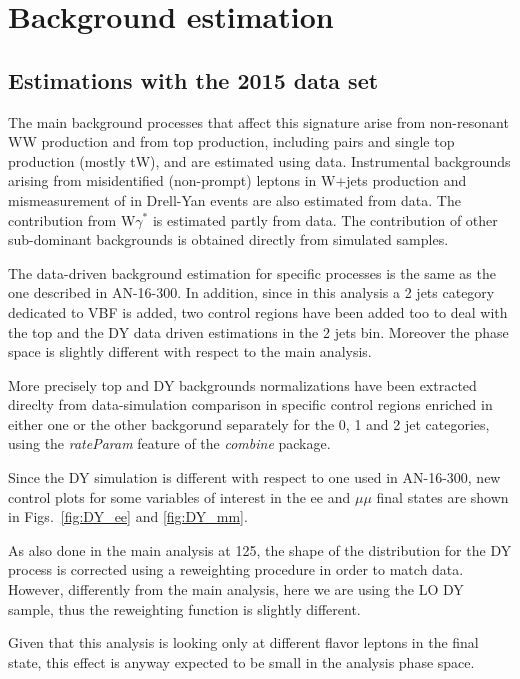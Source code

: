 \section{Background estimation}\label{sec:DataDriven}

\subsection{Estimations with the 2015 data set}

The main background processes that affect this signature arise from non-resonant WW production and from top production, including \ttbar pairs and single top production (mostly tW), and are estimated using data. Instrumental backgrounds arising from misidentified (non-prompt) leptons in W+jets production and mismeasurement of \MET in Drell-Yan events are also estimated from data. The contribution from W$\gamma^*$ is estimated partly from data. The contribution of other sub-dominant backgrounds is obtained directly from simulated samples.

The data-driven background estimation for specific processes is the same as the one described in AN-16-300. In addition, since in this analysis a 2 jets category dedicated to VBF is added, two control regions have been added too to deal with the top and the DY data driven estimations in the 2 jets bin. Moreover the phase space is slightly different with respect to the main \hww analysis.

More precisely top and DY backgrounds normalizations have been extracted direclty from data-simulation comparison in specific control regions enriched in either one or the other backgorund separately for the 0, 1 and 2 jet categories, using the \textit{rateParam} feature of the \textit{combine} package.

Since the DY simulation is different with respect to one used in AN-16-300, new control plots for some variables of interest in the ee and $\mu\mu$ final states are shown in Figs.~\ref{fig:DY_ee} and \ref{fig:DY_mm}.

As also done in the main \hww analysis at 125\GeV, the shape of the \ptll distribution for the DY process is corrected using a reweighting procedure in order to match data. However, differently from the main analysis, here we are using the LO DY sample, thus the reweighting function is slightly different.

Given that this analysis is looking only at different flavor leptons in the final state, this effect is anyway expected to be small in the analysis phase space.

